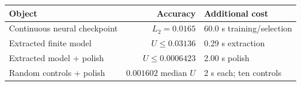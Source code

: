 \begin{tabular}{@{}lrl@{}}\toprule
Object & Accuracy & Additional cost\\\midrule
Continuous neural checkpoint & $L_2=0.0165$ & 60.0 s training/selection\\
Extracted finite model & $U\le 0.03136$ & 0.29 s extraction\\
Extracted model + polish & $U\le 0.0006423$ & 2.00 s polish\\
Random controls + polish & $0.001602$ median $U$ & 2 s each; ten controls\\
\bottomrule\end{tabular}

